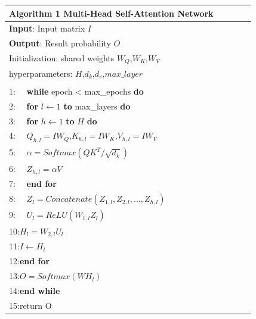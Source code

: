 \documentclass[a4paper]{cas-dc}
\begin{document}
\begin{table}[]
	\tabcolsep=1cm
	\label{algorithm}
	\begin{tabular*}{\tblwidth}{@{}lllll@{}}
		
		\toprule
		\textbf{Algorithm 1} Multi-Head Self-Attention Network  \\ \midrule
		\textbf{Input}: Input matrix $I$                           \\
		\textbf{Output}: Result probability $O$                    \\
		Initialization: shared weights $W_Q$,$W_K$,$W_V$           \\
		hyperparameters: $H$,$d_{k}$,$d_v$,$max\_layer$         \\
		\\
		1:  ~~\textbf{while} epoch < max\_epochs \textbf{do}                     \\
		2:  ~~\quad \textbf{for} $l \leftarrow  1$ \textbf{to} max\_layers \textbf{do}                     \\
		3:  ~~\qquad \textbf{for} $h \leftarrow 1$ \textbf{to} $H$ \textbf{do}                               \\
		4:  ~~\qquad \quad $Q_{h,l}=IW_Q$,$K_{h,l}=IW_K$,$V_{h,l}=IW_V$                       \\
		5:  ~~\qquad \quad $\alpha = Softmax(QK^T / \sqrt{d_k})$			\\
		6:  ~~\qquad \quad $Z_{h,l} = \alpha V$							\\
		7:  ~~\qquad \textbf{end for}                                       \\
		8:  ~~\qquad $Z_l = Concatenate(Z_{1,l},Z_{2,l},...,Z_{h,l})$            \\
		9:  ~~\qquad $U_l = ReLU(W_{1,l}Z_l)$                              \\
		10:\qquad $H_l = W_{2,l}U_l$                                    \\
		11:\qquad $I\leftarrow H_l$                                          \\
		12:\quad \textbf{end for}                                      \\
		13:\quad$O = Softmax(WH_l)$                                      \\
		14:\textbf{end while}								\\
		15:return O                                     \\
		\bottomrule
	\end{tabular*}
\end{table}
\end{document}
